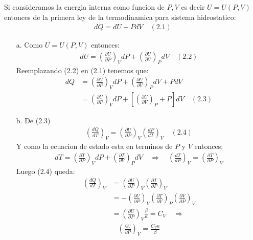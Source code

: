 \documentclass[a4paper]{article}
\begin{document}
    \begin{answer}
        Si consideramos la energia interna como funcion de $P, V$ es decir $U = U(P,V)$ entonces de la primera ley de la termodinamica para sistema hidrostatico:
    \begin{align*}
        dQ = dU + PdV  \quad (2.1)
    \end{align*}
    \begin{itemize}
        \item [a.]  Como $U = U(P,V)$ entonces:
        \begin{align*}
            dU = \left( \frac{\partial U}{\partial P} \right)_V dP + \left( \frac{\partial U}{\partial V} \right)_P dV \quad (2.2)       
       \end{align*}
       Reemplazando (2.2) en (2.1) tenemos que:
       \begin{align*}
           dQ &= \left( \frac{\partial U}{\partial P} \right)_V dP + \left( \frac{\partial U}{\partial V} \right)_P dV + PdV \\
            &= \left( \frac{\partial U}{\partial P} \right)_V dP + \left[ \left( \frac{\partial U}{\partial V} \right)_P + P \right] dV \quad (2.3)
        \end{align*}     
    \end{itemize} 
    \begin{itemize}
        \item [b.] De (2.3)
        \begin{align*}
            \left(
                \frac{dQ}{dT} 
                \right)_V = \left( \frac{\partial U}{\partial P} \right)_V \left( \frac{dP}{dT}\right)_V \quad  (2.4)
        \end{align*}
        Y como la ecuacion de estado esta en terminos de $P$ y $V$ entonces:
        \begin{align*}
            dT = \left( \frac{\partial T}{\partial P} \right)_V dP + \left( \frac{\partial T}{\partial V} \right)_P dV \quad \Rightarrow \quad \left( \frac{dT}{dP} \right)_V = \left( \frac{\partial T}{\partial P} \right)_V
        \end{align*}
        Luego (2.4) queda:
        \begin{align*}
            \left(
                \frac{dQ}{dT} 
                \right)_V &= \left( \frac{\partial U}{\partial P} \right)_V \left( \frac{\partial T}{\partial P}\right)_V \\
                &= -\left( \frac{\partial U}{\partial P} \right)_V \left( \frac{\partial T}{\partial V}\right)_P \left( \frac{\partial V}{\partial P}\right)_V \\
                &= \left( \frac{\partial U}{\partial P} \right)_V \frac{\beta}{\kappa} = C_V \quad  \Rightarrow
        \end{align*}
        \begin{align*}
            \left( \frac{\partial U}{\partial P} \right)_V = \frac{C_V \kappa}{\beta}
        \end{align*}


\end{itemize}
\end{answer}
\end{document}
